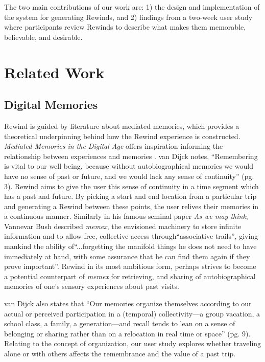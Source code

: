 \documentclass{sigchi}
\begin{document}
The two main contributions of our work are: 1) the design and implementation of the system for generating Rewinds, and 2) findings from a two-week user study where participants review Rewinds to describe what makes them memorable, believable, and desirable.

\section{Related Work}
\subsection{Digital Memories}
Rewind is guided by literature about mediated memories, which provides a theoretical underpinning behind how the Rewind experience is constructed. \textit{Mediated Memories in the Digital Age} offers inspiration informing the relationship between experiences and memories \cite{van2007mediated}. van Dijck notes, ``Remembering is vital to our well being, because without autobiographical memories we would have no sense of past or future, and we would lack any sense of continuity'' (pg. 3). Rewind aims to give the user this sense of continuity in a time segment which has a past and future. By picking a start and end location from a particular trip and generating a Rewind between these points, the user relives their memories in a continuous manner. Similarly in his famous seminal paper \textit{As we may think}, Vannevar Bush described \textit{memex}, the envisioned machinery to store infinite information and to allow free, collective access through``associative trails'', giving mankind the ability of``...forgetting the manifold things he does not need to have immediately at hand, with some assurance that he can find them again if they prove important''. Rewind in its most ambitious form, perhaps strives to become a potential counterpart of \textit{memex} for retrieving, and sharing of autobiographical memories of one’s sensory experiences about past visits.

van Dijck also states that ``Our memories organize themselves according to our actual or perceived participation in a (temporal) collectivity---a group vacation, a school class, a family, a generation---and recall tends to lean on a sense of belonging or sharing rather than on a relocation in real time or space'' (pg. 9). Relating to the concept of organization, our user study explores whether traveling alone or with others affects the remembrance and the value of a past trip. 
\end{document}

